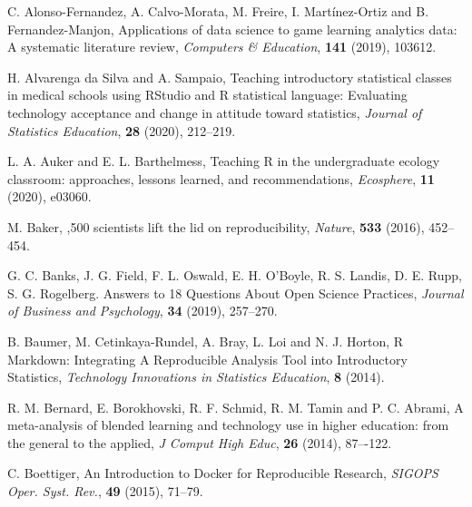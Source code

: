 \documentclass{aims} %
\theoremstyle{definition}
\begin{document}
\begin{thebibliography}{99}

     \newblock  C. Alonso-Fernandez,  A. Calvo-Morata, M. Freire, I. Martínez-Ortiz and B. Fernandez-Manjon,
     \newblock Applications of data science to game learning analytics data: A systematic literature review,
     \newblock \emph{Computers \& Education}, \textbf{141} (2019), 103612.

     \newblock  H. Alvarenga da Silva and A. Sampaio,
     \newblock Teaching introductory statistical classes in medical schools using RStudio and R statistical language: Evaluating technology acceptance and change in attitude toward statistics,
     \newblock \emph{Journal of Statistics Education}, \textbf{28} (2020), 212--219.

     \newblock  L. A. Auker and E. L. Barthelmess,
     \newblock Teaching R in the undergraduate ecology classroom: approaches, lessons learned, and recommendations,
     \newblock \emph{Ecosphere}, \textbf{11} (2020), e03060.

     \newblock  M. Baker,
     ,500 scientists lift the lid on reproducibility,
     \newblock \emph{Nature}, \textbf{533} (2016), 452--454.

     \newblock  G. C. Banks, J. G. Field, F. L. Oswald, E. H. O'Boyle, R. S. Landis, D. E. Rupp, S. G. Rogelberg.
     \newblock Answers to 18 Questions About Open Science Practices,
     \newblock \emph{Journal of Business and Psychology}, \textbf{34} (2019), 257--270.

     \newblock B. Baumer, M. Cetinkaya-Rundel, A. Bray, L. Loi and N. J. Horton,
     \newblock R Markdown: Integrating A Reproducible Analysis Tool into Introductory Statistics,
     \newblock \emph{Technology Innovations in Statistics Education}, \textbf{8} (2014).

     \newblock  R. M. Bernard, E. Borokhovski, R. F. Schmid, R. M. Tamin and P. C. Abrami,
     \newblock A meta-analysis of blended learning and technology use in higher education: from the general to the applied,
     \newblock \emph{J Comput High Educ}, \textbf{26} (2014), 87–-122.

     \newblock  C. Boettiger,
     \newblock An Introduction to Docker for Reproducible Research,
     \newblock \emph{SIGOPS Oper. Syst. Rev.}, \textbf{49} (2015), 71--79.


\end{thebibliography}
\end{document}
